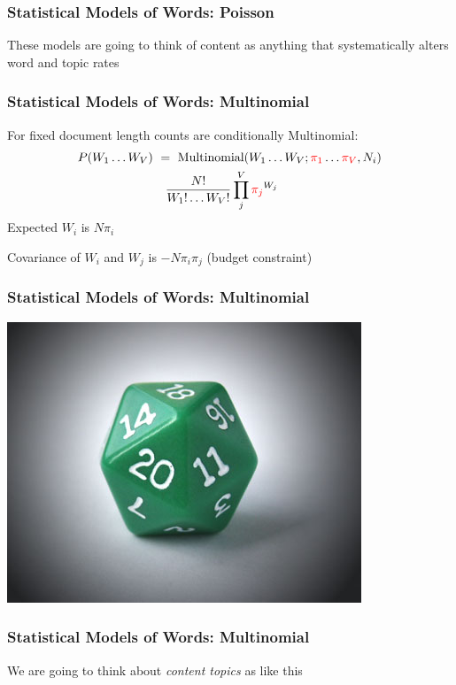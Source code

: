 \documentclass[11pt,compress,professionalfonts]{beamer}
\begin{document}
\begin{frame}[t]\frametitle{Statistical Models of Words: Poisson}

These models are going to think of content as anything that systematically alters word and topic rates


\end{frame}
\begin{frame}[t]\frametitle{Statistical Models of Words: Multinomial}

For fixed document length counts are conditionally Multinomial:
\begin{align*}
P(W_{1}\ldots W_{V}) &~=~ \text{Multinomial}(W_{1}\ldots W_{V}; \textcolor{red}{\pi_{1}}\ldots\textcolor{red}{\pi_{V}}, N_i)\\
&~~~\frac{N!}{W_{1}!\ldots W_{V}!} \prod^{V}_{j} \textcolor{red}{\pi_{j}}^{W_{j}}
\end{align*}
Expected $W_{i}$ is $N\pi_{i}$

Covariance of $W_{i}$ and $W_{j}$ is $-N \pi_{i}\pi_{j}$ (budget constraint)

\end{frame}
\begin{frame}[t]\frametitle{Statistical Models of Words: Multinomial}

\centerline{\includegraphics[scale=1]{pictures/20-sided-die}}

\end{frame}
\begin{frame}[t]\frametitle{Statistical Models of Words: Multinomial}

We are going to think about \textit{content topics} as like this

\end{frame}
\end{document}
